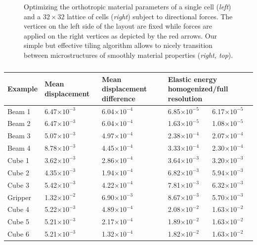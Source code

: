 \begin{figure}
	\centering
	\caption{Optimizing the orthotropic material parameters of a single cell (\emph{left}) and a $32\times32$ lattice of cells (\emph{right}) subject to directional forces. The vertices on the left side of the layout are fixed while forces are applied on the right vertices as depicted by the red arrows. Our simple but effective tiling algorithm allows to nicely transition between microstructures of smoothly material properties (\emph{right, top}).}
	\label{plot:res}
\end{figure}

\begin{table}
	\centering
	\footnotesize
	\caption{} 
	{\begin{tabularx}{\linewidth}{ |X| X | X | X | X | }
			\hline
			Example & Mean displacement & Mean displacement difference & \multicolumn{2}{p{3.2cm}|}{\centering Elastic energy \newline homogenized/full resolution}\\ \hline
			Beam 1 & 6.47$\times10^{-3}$ & 6.04$\times10^{-4}$ & 6.85$\times10^{-5}$ & 6.17$\times10^{-5}$ \\
			Beam 2 & 6.47$\times10^{-3}$ & 6.04$\times10^{-4}$ & 1.63$\times10^{-5}$ & 1.08$\times10^{-5}$ \\
			Beam 3 & 5.07$\times10^{-3}$ & 4.97$\times10^{-4}$ & 2.38$\times10^{-4}$ & 2.07$\times10^{-4}$ \\
			Beam 4 & 8.78$\times10^{-3}$ & 4.45$\times10^{-4}$ & 3.33$\times10^{-4}$ & 2.30$\times10^{-4}$ \\
			Cube 1 & 3.62$\times10^{-3}$ & 2.86$\times10^{-4}$ & 3.64$\times10^{-3}$ & 3.20$\times10^{-3}$ \\
			Cube 2 & 4.35$\times10^{-3}$ & 1.94$\times10^{-4}$ & 6.82$\times10^{-3}$ & 5.94$\times10^{-3}$ \\
			Cube 3 & 5.42$\times10^{-3}$ & 4.22$\times10^{-4}$ & 7.81$\times10^{-3}$ & 6.32$\times10^{-3}$ \\
			Gripper& 1.32$\times10^{-2}$ & 6.90$\times10^{-3}$ & 8.67$\times10^{-3}$ & 5.70$\times10^{-3}$ \\
			Cube 4 & 5.22$\times10^{-3}$ & 4.89$\times10^{-4}$ & 2.08$\times10^{-2}$ & 1.63$\times10^{-2}$ \\
			Cube 5 & 5.21$\times10^{-3}$ & 2.17$\times10^{-4}$ & 1.89$\times10^{-2}$ & 1.63$\times10^{-2}$ \\
			Cube 6 & 5.21$\times10^{-3}$ & 1.32$\times10^{-4}$ & 1.82$\times10^{-2}$ & 1.63$\times10^{-2}$ \\
			\hline
		\end{tabularx} }
		\label{tab:hom}
	\end{table}
	
